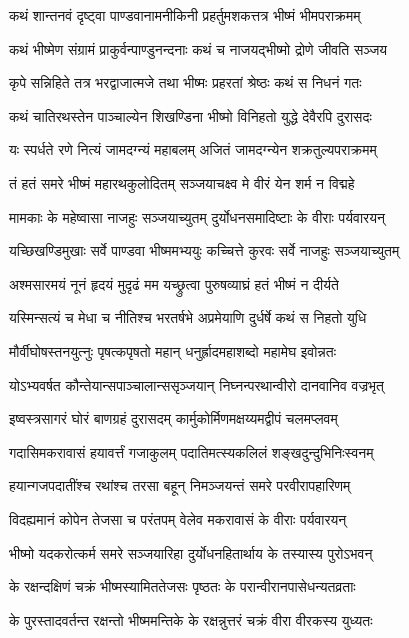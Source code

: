 \twolineshloka
{कथं शान्तनवं दृष्ट्वा पाण्डवानामनीकिनी}
{प्रहर्तुमशकत्तत्र भीष्मं भीमपराक्रमम्}


\twolineshloka
{कथं भीष्मेण संग्रामं प्राकुर्वन्पाण्डुनन्दनाः}
{कथं च नाजयद्भीष्मो द्रोणे जीवति सञ्जय}


\twolineshloka
{कृपे सन्निहिते तत्र भरद्वाजात्मजे तथा}
{भीष्मः प्रहरतां श्रेष्ठः कथं स निधनं गतः}


\twolineshloka
{कथं चातिरथस्तेन पाञ्चाल्येन शिखण्डिना}
{भीष्मो विनिहतो युद्धे देवैरपि दुरासदः}


\twolineshloka
{यः स्पर्धते रणे नित्यं जामदग्न्यं महाबलम्}
{अजितं जामदग्न्येन शक्रतुल्यपराक्रमम्}


\twolineshloka
{तं हतं समरे भीष्मं महारथकुलोदितम्}
{सञ्जयाचक्ष्व मे वीरं येन शर्म न विद्महे}


\twolineshloka
{मामकाः के महेष्वासा नाजहुः सञ्जयाच्युतम्}
{दुर्योधनसमादिष्टाः के वीराः पर्यवारयन्}


\twolineshloka
{यच्छिखण्डिमुखाः सर्वे पाण्डवा भीष्ममभ्ययुः}
{कच्चित्ते कुरवः सर्वे नाजहुः सञ्जयाच्युतम्}


\twolineshloka
{अश्मसारमयं नूनं हृदयं मुदृढं मम}
{यच्छ्रुत्वा पुरुषव्याघ्रं हतं भीष्मं न दीर्यते}


\twolineshloka
{यस्मिन्सत्यं च मेधा च नीतिश्च भरतर्षभे}
{अप्रमेयाणि दुर्धर्षे कथं स निहतो युधि}


\twolineshloka
{मौर्वीघोषस्तनयुत्नुः पृषत्कपृषतो महान्}
{धनुर्ह्रादमहाशब्दो महामेघ इवोन्नतः}


\twolineshloka
{योऽभ्यवर्षत कौन्तेयान्सपाञ्चालान्ससृञ्जयान्}
{निघ्नन्परथान्वीरो दानवानिव वज्रभृत्}


\twolineshloka
{इष्वस्त्रसागरं घोरं बाणग्रहं दुरासदम्}
{कार्मुकोर्मिणमक्षय्यमद्वीपं चलमप्लवम्}


\twolineshloka
{गदासिमकरावासं हयावर्त्तं गजाकुलम्}
{पदातिमत्स्यकलिलं शङ्खदुन्दुभिनिःस्वनम्}


\twolineshloka
{हयान्गजपदातींश्च रथांश्च तरसा बहून्}
{निमञ्जयन्तं समरे परवीरापहारिणम्}


\twolineshloka
{विदह्यमानं कोपेन तेजसा च परंतपम्}
{वेलेव मकरावासं के वीराः पर्यवारयन्}


\twolineshloka
{भीष्मो यदकरोत्कर्म समरे सञ्जयारिहा}
{दुर्योधनहितार्थाय के तस्यास्य पुरोऽभवन्}


\twolineshloka
{के रक्षन्दक्षिणं चक्रं भीष्मस्यामिततेजसः}
{पृष्ठतः के परान्वीरानपासेधन्यतव्रताः}


\twolineshloka
{के पुरस्तादवर्तन्त रक्षन्तो भीष्ममन्तिके}
{के रक्षन्नुत्तरं चक्रं वीरा वीरकस्य युध्यतः}


